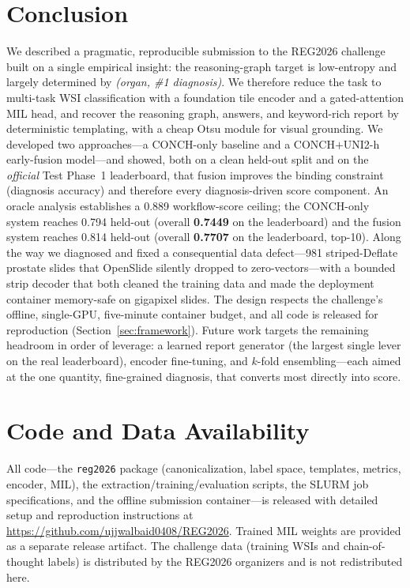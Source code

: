 \documentclass[11pt,a4paper]{article}
\newcommand{\code}[1]{\texttt{\small #1}}
\begin{document}
\section{Conclusion}
\label{sec:conclusion}

We described a pragmatic, reproducible submission to the REG2026 challenge built on a single
empirical insight: the reasoning-graph target is low-entropy and largely determined by
\emph{(organ, \#1 diagnosis)}. We therefore reduce the task to multi-task WSI classification with
a foundation tile encoder and a gated-attention MIL head, and recover the reasoning graph,
answers, and keyword-rich report by deterministic templating, with a cheap Otsu module for
visual grounding. We developed two approaches---a CONCH-only baseline and a CONCH$+$UNI2-h
early-fusion model---and showed, both on a clean held-out split and on the \emph{official} Test
Phase~1 leaderboard, that fusion improves the binding constraint (diagnosis accuracy) and
therefore every diagnosis-driven score component. An oracle analysis establishes a 0.889
workflow-score ceiling; the CONCH-only system reaches 0.794 held-out (overall \textbf{0.7449} on
the leaderboard) and the fusion system reaches 0.814 held-out (overall \textbf{0.7707} on the
leaderboard, top-10). Along the way we diagnosed and fixed a consequential data defect---981
striped-Deflate prostate slides that OpenSlide silently dropped to zero-vectors---with a bounded
strip decoder that both cleaned the training data and made the deployment container memory-safe on
gigapixel slides. The design respects the challenge's offline, single-GPU, five-minute container
budget, and all code is released for reproduction (Section~\ref{sec:framework}). Future work
targets the remaining headroom in order of leverage: a learned report generator (the largest
single lever on the real leaderboard), encoder fine-tuning, and $k$-fold ensembling---each aimed
at the one quantity, fine-grained diagnosis, that converts most directly into score.

\section*{Code and Data Availability}
All code---the \code{reg2026} package (canonicalization, label space, templates, metrics,
encoder, MIL), the extraction/training/evaluation scripts, the SLURM job specifications, and the
offline submission container---is released with detailed setup and reproduction instructions at
\url{https://github.com/ujjwalbaid0408/REG2026}. Trained MIL weights are provided as a separate
release artifact. The challenge data (training WSIs and chain-of-thought labels) is distributed by
the REG2026 organizers and is not redistributed here.
\end{document}
